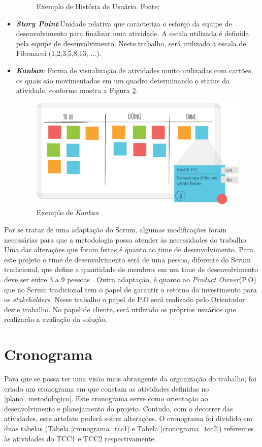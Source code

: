\begin{itemize}
\begin{figure}[H]
\caption{Exemplo de História de Usuário. Fonte: \cite{sabbagh_scrum:_2014}}
\label{img:us}
\end{figure}
\item \textit{\textbf{Story Point}}:Unidade relativa que caracteriza o esforço da equipe de desenvolvimento para finalizar uma atividade. A escala utilizada é definida pela equipe de desenvolvimento. Neste trabalho, será utilizado a escala de Fibonacci (1,2,3,5,8,13, ...). 
\item \textit{\textbf{Kanban}}: Forma de visualização de atividades muito utilizadas com cartões, os quais são movimentados em um quadro determinando o status da atividade, conforme mostra a Figura \ref{img:kanban}.
\graphicspath{{figuras/}}
\begin{figure}[H]
\centering
\includegraphics[scale=0.40]{kanban}
\caption{Exemplo de \textit{Kanban}}
\label{img:kanban}
\end{figure}

\end{itemize}

Por se tratar de uma adaptação do Scrum, algumas modificações foram necessárias para que a metodologia possa atender às necessidades do trabalho. Uma das alterações que foram feitas é quanto ao time de desenvolvimento. Para este projeto o time de desenvolvimento será de uma pessoa, diferente do Scrum tradicional, que define a quantidade de membros em um time de desenvolvimento deve ser entre 3 a 9 pessoas \cite{sabbagh_scrum:_2014}. Outra adaptação, é quanto ao \textit{Product Owner}(P.O) que no Scrum tradicional tem o papel de garantir o retorno do investimento para os \textit{stakeholders}. Nesse trabalho o papel de P.O será realizado pelo Orientador deste trabalho. No papel de cliente, será utilizado os próprios usuários que realizarão a avaliação da solução.

\section{Cronograma}
\label{cronograma}
Para que se possa ter uma visão mais abrangente da organização do trabalho, foi criado um cronograma em que constam as atividades definidas no \ref{plano_metodologico}. Este cronograma serve como orientação ao desenvolvimento e planejamento do projeto. Contudo, com o decorrer das atividades, este artefato poderá sofrer alterações. O cronograma foi dividido em duas tabelas (Tabela \ref{cronograma_tcc1} e Tabela \ref{cronograma_tcc2}) referentes às atividades do TCC1 e TCC2 respectivamente.

